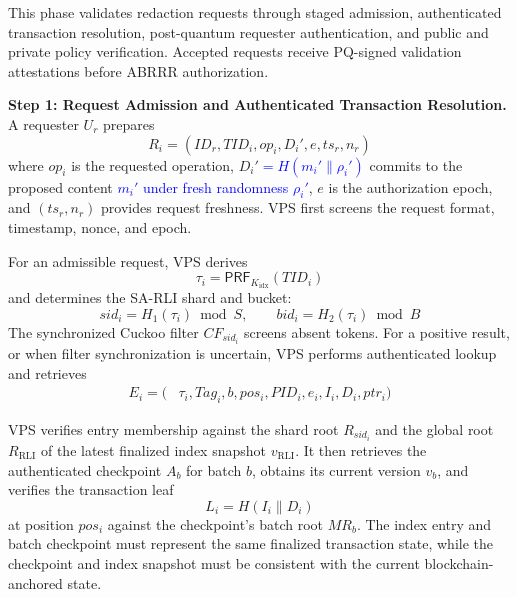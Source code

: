 \documentclass[lettersize,journal]{IEEEtran}
\begin{document}
This phase validates redaction requests through staged
admission, authenticated transaction resolution,
post-quantum requester authentication, and public
and private policy verification. Accepted requests
receive PQ-signed validation attestations before
ABRRR authorization.

\medskip
\noindent\textbf{Step 1: Request Admission and
Authenticated Transaction Resolution.}
A requester $U_r$ prepares
\begin{equation}
R_i=(ID_r,TID_i,op_i,D_i',e,ts_r,n_r)
\end{equation}
where $op_i$ is the requested operation, $D_i'$\textcolor{blue}{$=H(m_i'\parallel\rho_i')$}
commits to the proposed content\textcolor{blue}{ $m_i'$ under fresh
randomness $\rho_i'$}, $e$ is the
authorization epoch, and $(ts_r,n_r)$ provides
request freshness. VPS first screens the request
format, timestamp, nonce, and epoch.

For an admissible request, VPS derives
\begin{equation}
\tau_i=\mathsf{PRF}_{K_{\mathrm{idx}}}(TID_i)
\end{equation}
and determines the SA-RLI shard and bucket:
\begin{equation}
sid_i=H_1(\tau_i)\bmod S,
\qquad
bid_i=H_2(\tau_i)\bmod B
\end{equation}
The synchronized Cuckoo filter $CF_{sid_i}$
screens absent tokens. For a positive result,
or when filter synchronization is uncertain,
VPS performs authenticated lookup and retrieves
\begin{equation}
\begin{aligned}
E_i=\big(&\tau_i,Tag_i,b,pos_i,PID_i,e_i,I_i,D_i,ptr_i\big)
\end{aligned}
\end{equation}

VPS verifies entry membership against the shard
root $R_{sid_i}$ and the global root
$R_{\mathrm{RLI}}$ of the latest finalized index
snapshot $v_{\mathrm{RLI}}$. It then retrieves
the authenticated checkpoint $A_b$ for batch
$b$, obtains its current version $v_b$, and
verifies the transaction leaf
\begin{equation}
L_i=H(I_i\parallel D_i)
\end{equation}
at position $pos_i$ against the checkpoint's
batch root $MR_b$. The index entry and batch
checkpoint must represent the same finalized
transaction state, while the checkpoint and
index snapshot must be consistent with the
current blockchain-anchored state.
\end{document}
